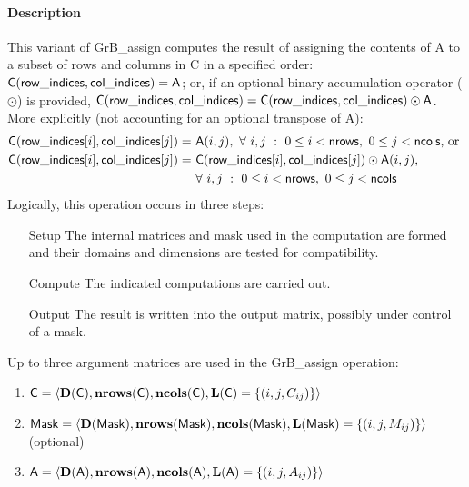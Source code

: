 \paragraph{Description}

This variant of {\sf GrB\_assign} computes the result of assigning the contents
of {\sf A} to a subset of rows and columns in {\sf C} in a specified order:
${\sf C}({\sf row\_indices},{\sf col\_indices}) = {\sf A}$; or, if an optional 
binary accumulation operator ($\odot$) is provided, 
${\sf C}({\sf row\_indices},{\sf col\_indices}) = 
{\sf C}({\sf row\_indices},{\sf col\_indices}) \odot {\sf A}$.
More explicitly (not accounting for an optional transpose of {\sf A}):
\[
\begin{aligned}
  	{\sf C}({\sf row\_indices}[i],{\sf col\_indices}[j]) = &\ {\sf A}(i,j), 
 	\ \forall \ i,j \ : \ 0 \leq i < {\sf nrows},\ 0 \leq j < {\sf ncols} \mbox{,~or~}
\\
  	{\sf C}({\sf row\_indices}[i],{\sf col\_indices}[j]) = &\ 
    {\sf C}({\sf row\_indices}[i],{\sf col\_indices}[j]) \odot {\sf A}(i,j), \\
 	& \ \forall \ i,j \ : \ 0 \leq i < {\sf nrows},\ 0 \leq j < {\sf ncols}
\end{aligned}
\]  
Logically, this operation occurs in three steps:
\begin{enumerate}[leftmargin=0.75in]
\item[Setup] The internal matrices and mask used in the computation are formed 
and their domains and dimensions are tested for compatibility.
\item[Compute] The indicated computations are carried out.
\item[Output] The result is written into the output matrix, possibly under 
control of a mask.
\end{enumerate}

Up to three argument matrices are used in the {\sf GrB\_assign} operation:
\begin{enumerate}
	\item ${\sf C} = \langle \bold{D}({\sf C}),\bold{nrows}({\sf C}),
    \bold{ncols}({\sf C}),\bold{L}({\sf C}) = \{(i,j,C_{ij}) \} \rangle$
    
	\item ${\sf Mask} = \langle \bold{D}({\sf Mask}),\bold{nrows}({\sf Mask}),
    \bold{ncols}({\sf Mask}),\bold{L}({\sf Mask}) = \{(i,j,M_{ij}) \} \rangle$ (optional)
    
	\item ${\sf A} = \langle \bold{D}({\sf A}),\bold{nrows}({\sf A}), 
    \bold{ncols}({\sf A}),\bold{L}({\sf A}) = \{(i,j,A_{ij}) \} \rangle$
\end{enumerate}

